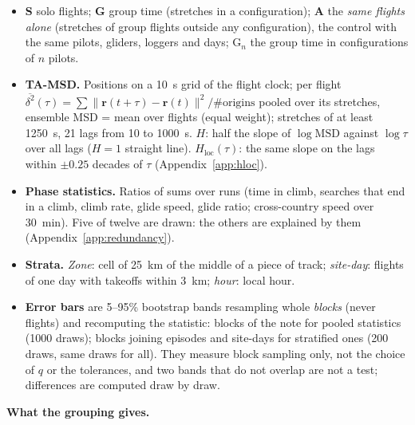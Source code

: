 \documentclass[10pt,a4paper]{article}
\newcommand{\G}{\mathrm{G}}
\begin{document}
\begin{itemize}
  \item \textbf{S} solo flights; \textbf{G} group time (stretches in a configuration);
        \textbf{A} the \emph{same flights alone} (stretches of group flights outside any
        configuration), the control with the same pilots, gliders, loggers and days; $\G_n$ the
        group time in configurations of $n$ pilots.
  \item \textbf{TA-MSD.} Positions on a 10~s grid of the flight clock; per flight
        $\overline{\delta^2}(\tau)=\sum\|\mathbf r(t+\tau)-\mathbf r(t)\|^2/\#\text{origins}$ pooled over
        its stretches, ensemble MSD = mean over flights (equal weight); stretches of at least
        1250~s, 21 lags from 10 to 1000~s. $H$: half the slope of $\log\mathrm{MSD}$ against $\log\tau$ over all lags
        ($H=1$ straight line). $H_\mathrm{loc}(\tau)$: the same slope on the lags within
        $\pm0.25$ decades of $\tau$ (Appendix~\ref{app:hloc}).
  \item \textbf{Phase statistics.} Ratios of sums over runs (time in climb, searches that end in a
        climb, climb rate, glide speed, glide ratio; cross-country speed over 30~min). Five of
        twelve are drawn: the others are explained by them (Appendix~\ref{app:redundancy}).
  \item \textbf{Strata.} \emph{Zone}: cell of 25~km of the middle of a piece of track;
        \emph{site-day}: flights of one day with takeoffs within 3~km; \emph{hour}: local hour.
  \item \textbf{Error bars} are 5--95\% bootstrap bands resampling whole \emph{blocks} (never
        flights) and recomputing the statistic: blocks of the note for pooled statistics (1000 draws);
        blocks joining episodes and site-days for stratified ones (200 draws, same draws for all).
        They measure block sampling only, not the choice of $q$ or the tolerances, and two bands that
        do not overlap are not a test; differences are computed draw by draw.
\end{itemize}

\textbf{What the grouping gives.} 






\end{document}
